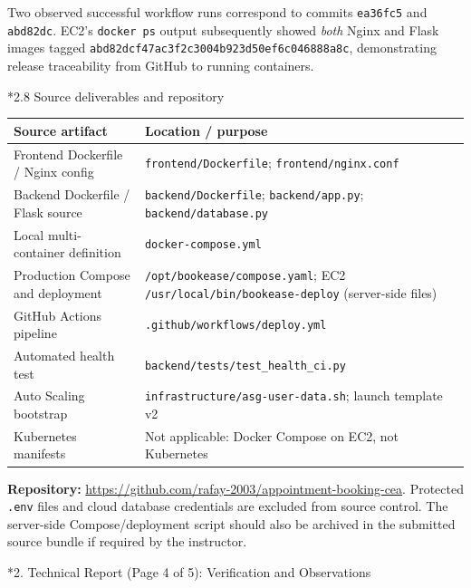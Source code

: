 \documentclass[10pt,a4paper]{article}
\makeatletter
\renewcommand{\section}{\@startsection{section}{1}{0pt}{11pt}{5pt}{\normalfont\large\bfseries\color{navy}}}
\renewcommand{\subsection}{\@startsection{subsection}{2}{0pt}{7pt}{3pt}{\normalfont\normalsize\bfseries\color{navy}}}
\makeatother
\begin{document}
Two observed successful workflow runs correspond to commits \texttt{ea36fc5} and \texttt{abd82dc}. EC2's \texttt{docker ps} output subsequently showed \emph{both} Nginx and Flask images tagged \texttt{abd82dcf47ac3f2c3004b923d50ef6c046888a8c}, demonstrating release traceability from GitHub to running containers.

\subsection*{2.8 Source deliverables and repository}
\small
\begin{tabularx}{\linewidth}{@{}p{57mm}X@{}}
\toprule
\textbf{Source artifact} & \textbf{Location / purpose}\\
\midrule
Frontend Dockerfile / Nginx config & \texttt{frontend/Dockerfile}; \texttt{frontend/nginx.conf}\\
Backend Dockerfile / Flask source & \texttt{backend/Dockerfile}; \texttt{backend/app.py}; \texttt{backend/database.py}\\
Local multi-container definition & \texttt{docker-compose.yml}\\
Production Compose and deployment & \texttt{/opt/bookease/compose.yaml}; EC2 \texttt{/usr/local/bin/bookease-deploy} (server-side files)\\
GitHub Actions pipeline & \texttt{.github/workflows/deploy.yml}\\
Automated health test & \texttt{backend/tests/test\_health\_ci.py}\\
Auto Scaling bootstrap & \texttt{infrastructure/asg-user-data.sh}; launch template v2\\
Kubernetes manifests & Not applicable: Docker Compose on EC2, not Kubernetes\\
\bottomrule
\end{tabularx}
\normalsize
\textbf{Repository:} \url{https://github.com/rafay-2003/appointment-booking-cea}. Protected \texttt{.env} files and cloud database credentials are excluded from source control. The server-side Compose/deployment script should also be archived in the submitted source bundle if required by the instructor.
\clearpage

\section*{2. Technical Report (Page 4 of 5): Verification and Observations}
\end{document}
